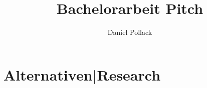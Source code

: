 \documentclass[a4paper,10pt]{article}
\title{Bachelorarbeit Pitch}
\author{Daniel Pollack}
\date{}
\begin{document}
\maketitle
\tableofcontents
\newpage


\section{Alternativen|Research}



\end{document}
